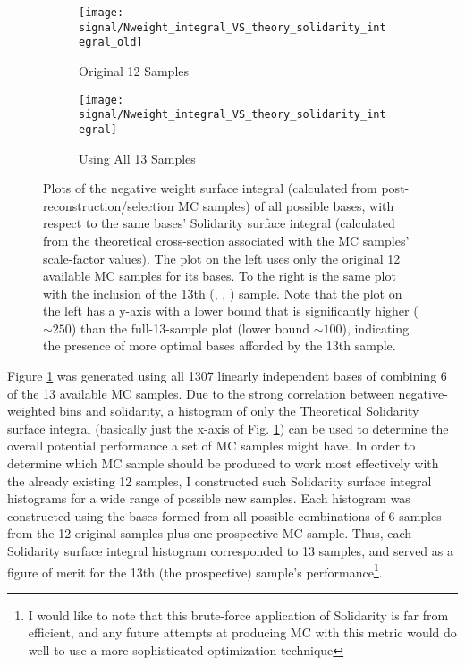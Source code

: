     \begin{figure}[tbh]
        \begin{subfigure}{0.5\textwidth}
            \texttt{[image: signal/Nweight\_integral\_VS\_theory\_solidarity\_integral\_old]}
            \captionsetup{justification=centering} \caption{Original 12 Samples}
        \end{subfigure}
        \begin{subfigure}{0.5\textwidth}
            \texttt{[image: signal/Nweight\_integral\_VS\_theory\_solidarity\_integral]}
            \captionsetup{justification=centering} \caption{Using All 13 Samples}
        \end{subfigure}
        \caption{
            Plots of the negative weight surface integral (calculated from post-reconstruction/selection MC samples)
                of all possible bases, with respect to the same bases' Solidarity surface integral
                (calculated from the theoretical cross-section associated with the MC samples' scale-factor values).
            The plot on the left uses only the original 12 available MC samples for its bases.
            To the right is the same plot with the inclusion of the 13th (, , ) sample.
            Note that the plot on the left has a y-axis with a lower bound that is significantly higher ($\sim 250$) 
                than the full-13-sample plot (lower bound $\sim 100$),
                indicating the presence of more optimal bases afforded by the 13th sample.
        }
        \label{fig:nWeight_solidarity_scatter}
    \end{figure}


    Figure \ref{fig:nWeight_solidarity_scatter} was generated using all 1307 linearly independent bases of combining 6 of the 13 available MC samples.
    Due to the strong correlation between negative-weighted bins and solidarity,
        a histogram of only the Theoretical Solidarity surface integral
        (basically just the x-axis of Fig. \ref{fig:nWeight_solidarity_scatter})
        can be used to determine the overall potential performance a set of MC samples might have.
    In order to determine which MC sample should be produced to work most effectively with the already existing 12 samples,
        I constructed such Solidarity surface integral histograms for a wide range of possible new samples.
    Each histogram was constructed using the bases formed from all possible combinations of 6 samples from
        the 12 original samples plus one prospective MC sample.
    Thus, each Solidarity surface integral histogram corresponded to 13 samples,
        and served as a figure of merit for the 13th (the prospective) sample's performance\footnote{
    I would like to note that this brute-force application of Solidarity is far from efficient,
        and any future attempts at producing MC with this metric
        would do well to use a more sophisticated optimization technique}.

